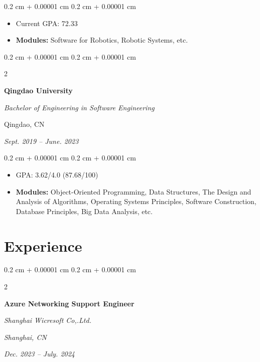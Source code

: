 \documentclass[10pt, letterpaper]{article}
\newenvironment{highlights}{
    \begin{itemize}[
        topsep=0.10 cm,
        parsep=0.10 cm,
        partopsep=0pt,
        itemsep=0pt,
        leftmargin=0.4 cm + 10pt
    ]
}{
    \end{itemize}
} %
\newenvironment{onecolentry}{
    \begin{adjustwidth}{
        0.2 cm + 0.00001 cm
    }{
        0.2 cm + 0.00001 cm
    }
}{
    \end{adjustwidth}
} %
\newenvironment{twocolentry}[2][]{
    \onecolentry
    \def\secondColumn{#2}
    \setcolumnwidth{\fill, 6 cm}
    \begin{paracol}{2}
}{
    \switchcolumn \raggedleft \secondColumn
    \end{paracol}
    \endonecolentry
} %
\begin{document}
        \vspace{0.10 cm}
        \begin{onecolentry}
            \begin{highlights}
                \item Current GPA: 72.33
                \item \textbf{Modules:} Software for Robotics, Robotic Systems, etc.
            \end{highlights}
        \end{onecolentry}
        \vspace{0.20 cm}

\begin{twocolentry}{
         Qingdao, CN   
            
        \textit{Sept. 2019 – June. 2023}}
            \textbf{Qingdao University}

            \textit{Bachelor of Engineering in Software Engineering}
        \end{twocolentry}

        \vspace{0.10 cm}
        \begin{onecolentry}
            \begin{highlights}
                \item GPA: 3.62/4.0 (87.68/100)
                \item \textbf{Modules:} Object-Oriented Programming, Data Structures, The Design and Analysis of Algorithms, 
Operating Systems Principles, Software Construction, Database Principles, Big Data Analysis, etc.
            \end{highlights}
        \end{onecolentry}


    
    \section{Experience}



        
        \begin{twocolentry}{
        \textit{Shanghai, CN}    
            
        \textit{Dec. 2023 – July. 2024}}
            \textbf{Azure Networking Support Engineer }
            
            \textit{Shanghai Wicresoft Co,.Ltd.}
        \end{twocolentry}
\end{document}
